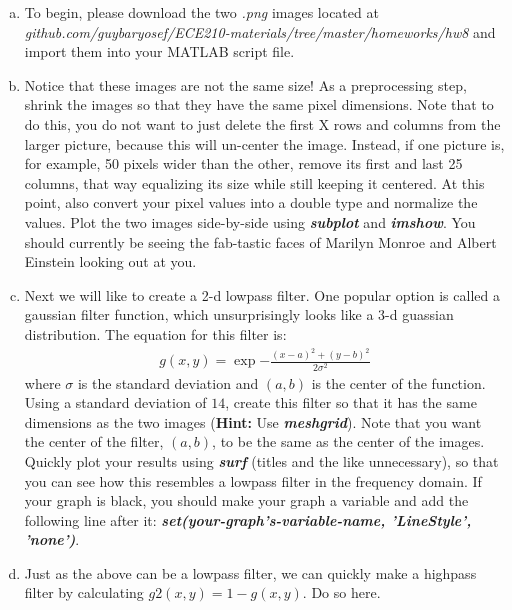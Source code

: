 \documentclass[11pt]{article}
\begin{document}
\begin{enumerate}[a.]
    \item To begin, please download the two \textit{.png} images located at
    \textit{github.com/guybaryosef/ECE210-materials/tree/master/homeworks/hw8}
    and import them into your MATLAB script file.

    \item Notice that these images are not the same size!
    As a preprocessing step, shrink the images so that they have the same
    pixel dimensions.
    Note that to do this, you do not want to just delete the first X rows and columns 
    from the larger picture, because this will un-center the image.
    Instead, if one picture is, for example, 50 pixels wider than the other, 
    remove its first and last 25 columns,
    that way equalizing its size while still keeping it centered.
    At this point, also convert your pixel values into a double type and 
    normalize the values.
    Plot the two images side-by-side using \textit{\textbf{subplot}}
    and \textit{\textbf{imshow}}.
    You should currently be seeing the fab-tastic faces of Marilyn Monroe and
    Albert Einstein looking out at you.

    \item Next we will like to create a 2-d lowpass filter.
    One popular option is called a gaussian filter function,
    which unsurprisingly looks like a 3-d guassian distribution.
    The equation for this filter is:
    \begin{align*}
        g(x,y) = \exp{-\frac{(x-a)^2 +(y-b)^2}{2\sigma^2}}
    \end{align*}
    where $\sigma$ is the standard deviation and $(a,b)$ is the center of the function.
    Using a standard deviation of $14$,
    create this filter so that it has the same dimensions as the two images
    (\textbf{Hint:} Use \textbf{\textit{meshgrid}}).
    Note that you want the center of the filter, $(a,b)$, to be the same as the center of the images.
    Quickly plot your results using \textbf{\textit{surf}} (titles and the like unnecessary),
    so that you can see how this resembles a lowpass filter in the frequency domain.
    If your graph is black, you should make your graph a variable and add
    the following line after it:
    \textbf{\textit{set(your-graph's-variable-name, 'LineStyle', 'none')}}.

    \item Just as the above can be a lowpass filter, we can quickly make
    a highpass filter by calculating $g2(x,y) = 1 - g(x,y)$.
    Do so here.


\end{enumerate}
\end{document}
